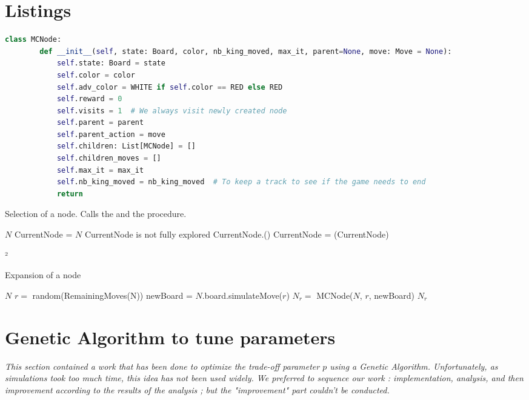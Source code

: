 \documentclass[11pt,a4paper]{article}
\begin{document}
\newpage
\begin{appendices}
\section{Listings}
\begin{lstlisting}[language=python, label=listing:constructor, caption={Constructor of a Monte-Carlo Tree-Search Node}]
    class MCNode:
        def __init__(self, state: Board, color, nb_king_moved, max_it, parent=None, move: Move = None):
            self.state: Board = state
            self.color = color
            self.adv_color = WHITE if self.color == RED else RED
            self.reward = 0
            self.visits = 1  # We always visit newly created node
            self.parent = parent
            self.parent_action = move
            self.children: List[MCNode] = []
            self.children_moves = []
            self.max_it = max_it
            self.nb_king_moved = nb_king_moved  # To keep a track to see if the game needs to end
            return
    \end{lstlisting}

    
    \begin{algorithm}
    \caption{Selection of a node. Calls the  and the  procedure.}\label{listing:selection}
    \begin{algorithmic}
        \State $N$
        \State CurrentNode = $N$ 
        \If 
        {CurrentNode is not fully explored} 
        \State \Return CurrentNode.()
        \Else 
        \State CurrentNode = (CurrentNode)
        \EndIf
        \EndWhile
        \EndProcedure
    \end{algorithmic}
\end{algorithm}
²
\begin{algorithm}
    \caption{Expansion of a node}\label{listing:expand}
    \begin{algorithmic}
    \State $N$
    \State $r = $ random(RemainingMoves(N))
    \State newBoard = $N$.board.simulateMove($r$)
    \State $N_r = $ MCNode($N$, $r$, newBoard)
    \State \Return $N_r$
    \EndProcedure
    \end{algorithmic}
\end{algorithm}

\section{Genetic Algorithm to tune parameters}
\textit{This section contained a work that has been done to optimize the trade-off parameter $p$ using a Genetic Algorithm. Unfortunately, as simulations took too much time, this idea has not been used widely. We preferred to sequence our work : implementation, analysis, and then improvement according to the results of the analysis ; but the "improvement" part couldn't be conducted.}

\end{appendices}
\end{document}
